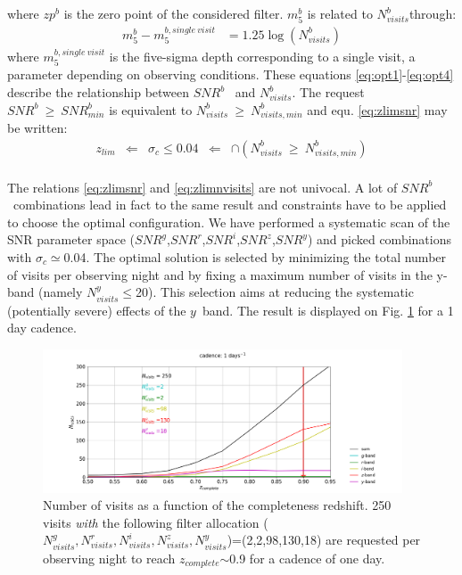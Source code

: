 \documentclass[\docopts]{\docclass}
\newcommand{\snrb}{\mbox{$SNR^b$}}
\newcommand{\snrbmin}{\mbox{$SNR^b_{min}$}}
\newcommand{\snrg}{\mbox{$SNR^g$}}
\newcommand{\snrr}{\mbox{$SNR^r$}}
\newcommand{\snri}{\mbox{$SNR^i$}}
\newcommand{\snrz}{\mbox{$SNR^z$}}
\newcommand{\snry}{\mbox{$SNR^y$}}
\newcommand{\by}{{$y$}}
\newcommand{\sigc}{\mbox{$\sigma_c$}}
\newcommand{\zlim}{\mbox{$z_{lim}$}}
\newcommand{\zcomp}{\mbox{$z_{complete}$}}
\newcommand{\seq}{$\sim$}
\newcommand{\nvisitsb}{\mbox{$N_{visits}^b$}}
\newcommand{\nvisitsbmin}{\mbox{$N_{visits,min}^b$}}
\newcommand{\nvisitsy}{$N_{visits}^y$}
\newcommand{\nvisitsall}{$N_{visits}^g,N_{visits}^r,N_{visits}^i,N_{visits}^z,N_{visits}^y$}
\begin{document}
where $zp^b$ is the zero point of the considered filter.  $m_5^b$ is related to \nvisitsb through:
\begin{equation}
  \begin{aligned}
    m_5^b - m_5^{b, single~visit} & =  1.25 \log(N_{visits}^b)
    \end{aligned}
  \label{eq:opt4}
\end{equation}
where $m_5^{b, single~visit}$ is the five-sigma depth corresponding to a single visit, a parameter depending on observing conditions. These equations \eqref{eq:opt1}-\eqref{eq:opt4} describe the relationship between \snrb~ and \nvisitsb. The request $\snrb~\geq~\snrbmin$ is equivalent to $\nvisitsb~\geq~\nvisitsbmin$ and equ. \eqref{eq:zlimsnr} may be written:
\begin{equation}
  \begin{aligned}
    \zlim &\Longleftarrow & \sigc \leq 0.04 & \Longleftarrow &\cap (\nvisitsb~\geq~\nvisitsbmin)
    \end{aligned}
 \label{eq:zlimnvisits}
\end{equation}
\\
The relations \eqref{eq:zlimsnr} and \eqref{eq:zlimnvisits} are not univocal. A lot of \snrb~combinations lead in fact to the same result and constraints have to be applied to choose the optimal configuration. We have performed a systematic scan of the SNR parameter space (\snrg,\snrr,\snri,\snrz,\snry) and picked combinations with \sigc$\simeq$0.04.  The optimal solution is selected by minimizing the total number of visits per observing night and by fixing a maximum number of visits in the y-band (namely \nvisitsy$\leq$20). This selection aims at reducing the systematic (potentially severe) effects of the \by~band. The result is displayed on Fig. \ref{fig:nvisits_zlim} for a 1 day cadence. 

\begin{figure}[htbp]
\begin{center}
  \includegraphics[width=0.95\textwidth]{nvisits_zlim.png}
 \caption{Number of visits as a function of the completeness redshift. 250 visits {\it with} the following filter allocation (\nvisitsall)=(2,2,98,130,18) are requested per observing night to reach \zcomp\seq0.9 for a cadence of one day.}\label{fig:nvisits_zlim}
\end{center}
\end{figure}
\end{document}
